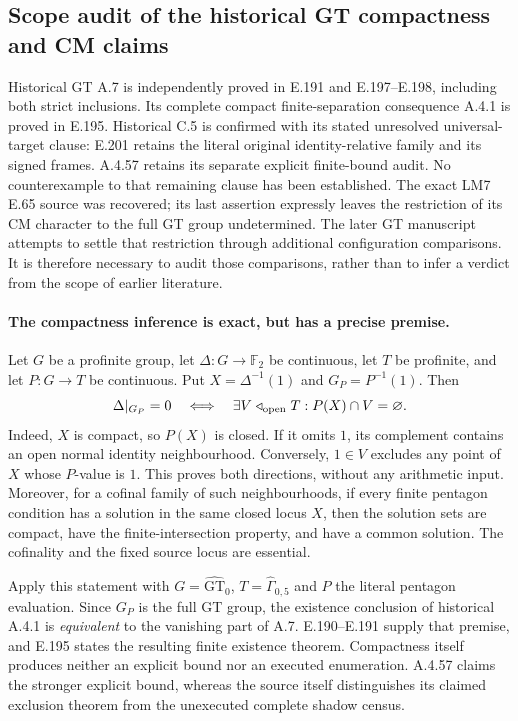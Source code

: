 \subsection{Scope audit of the historical GT compactness and CM claims}
\label{sec:historical-gt-scope}

Historical GT A.7 is independently proved in E.191 and
E.197--E.198, including both strict inclusions.  Its complete
compact finite-separation consequence A.4.1 is proved in E.195.
Historical C.5 is confirmed with its stated unresolved universal-target clause: E.201 retains the literal original identity-relative family and its signed frames.
A.4.57 retains its separate explicit finite-bound audit.
No counterexample to that remaining clause has been
established.  The exact LM7 E.65 source was recovered;
its last assertion expressly leaves the restriction of its CM
character to the full GT group undetermined.  The later GT
manuscript attempts to settle that restriction through additional
configuration comparisons.  It is therefore necessary to audit
those comparisons, rather than to infer a verdict from the scope
of earlier literature.

\paragraph{The compactness inference is exact, but has a precise premise.}
Let $G$ be a profinite group, let $\Delta:G\to\mathbb F_2$ be
continuous, let $T$ be profinite, and let $P:G\to T$ be continuous.
Put $X=\Delta^{-1}(1)$ and $G_P=P^{-1}(1)$.  Then
\[
 \Delta|_{G_P}=0
 \quad\Longleftrightarrow\quad
 \exists V\mathrel{\triangleleft}_{\rm open}T:
                    P(X)\cap V=\varnothing.
\]
Indeed, $X$ is compact, so $P(X)$ is closed.  If it omits $1$,
its complement contains an open normal identity neighbourhood.
Conversely, $1\in V$ excludes any point of $X$ whose $P$-value
is $1$.  This proves both directions, without any arithmetic
input.  Moreover, for a cofinal family of such neighbourhoods,
if every finite pentagon condition has a solution in the same
closed locus $X$, then the solution sets are compact, have the
finite-intersection property, and have a common solution.  The
cofinality and the fixed source locus are essential.

Apply this statement with
$G=\widehat{\mathrm{GT}}_0$, $T=\widehat\Gamma_{0,5}$ and
$P$ the literal pentagon evaluation.  Since $G_P$ is the full
GT group, the existence conclusion of historical A.4.1 is
\emph{equivalent} to the vanishing part of A.7.
E.190--E.191 supply that premise, and E.195 states the
resulting finite existence theorem.  Compactness itself
produces neither an explicit bound nor an executed
enumeration.  A.4.57 claims the stronger explicit
bound, whereas the source itself distinguishes its claimed
exclusion theorem from the unexecuted complete shadow census.

